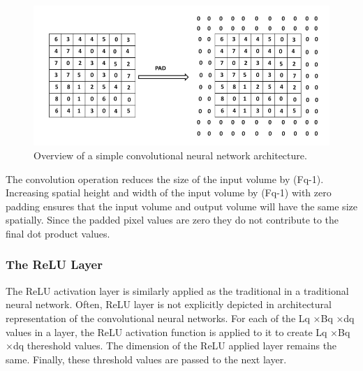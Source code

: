 \begin{figure}[h]
\centering
 \includegraphics[width=\linewidth]{Figures/fig_cnn_padding.png}
 \caption{Overview of a simple convolutional neural network architecture.}
 \label{fig:cnn_padding}
\end{figure}

The convolution operation reduces the size of the input volume by (Fq-1). Increasing spatial height and width of the input volume by (Fq-1) with zero padding ensures that the input volume and output volume will have the same size spatially. Since the padded pixel values are zero they do not contribute to the final dot product values. 
\subsubsection{The ReLU Layer}
The ReLU activation layer is similarly applied as the traditional in a traditional neural network. Often, ReLU layer is not explicitly depicted in architectural representation of the convolutional neural networks. For each of the Lq ×Bq ×dq values in a layer, the ReLU activation function is applied to it to create Lq ×Bq ×dq thereshold values. The dimension of the ReLU applied layer remains the same. Finally, these threshold values are passed to the next layer. %
